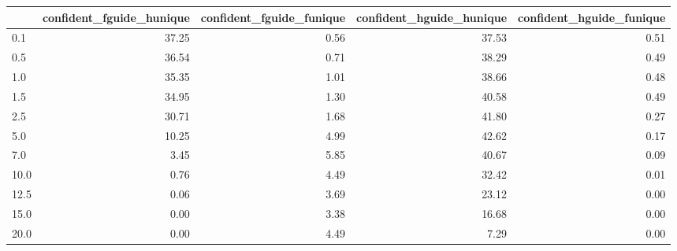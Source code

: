 \begin{tabular}{lrrrr}
\toprule
 & confident_fguide_hunique & confident_fguide_funique & confident_hguide_hunique & confident_hguide_funique \\
\midrule
0.1 & 37.25 & 0.56 & 37.53 & 0.51 \\
0.5 & 36.54 & 0.71 & 38.29 & 0.49 \\
1.0 & 35.35 & 1.01 & 38.66 & 0.48 \\
1.5 & 34.95 & 1.30 & 40.58 & 0.49 \\
2.5 & 30.71 & 1.68 & 41.80 & 0.27 \\
5.0 & 10.25 & 4.99 & 42.62 & 0.17 \\
7.0 & 3.45 & 5.85 & 40.67 & 0.09 \\
10.0 & 0.76 & 4.49 & 32.42 & 0.01 \\
12.5 & 0.06 & 3.69 & 23.12 & 0.00 \\
15.0 & 0.00 & 3.38 & 16.68 & 0.00 \\
20.0 & 0.00 & 4.49 & 7.29 & 0.00 \\
\bottomrule
\end{tabular}
